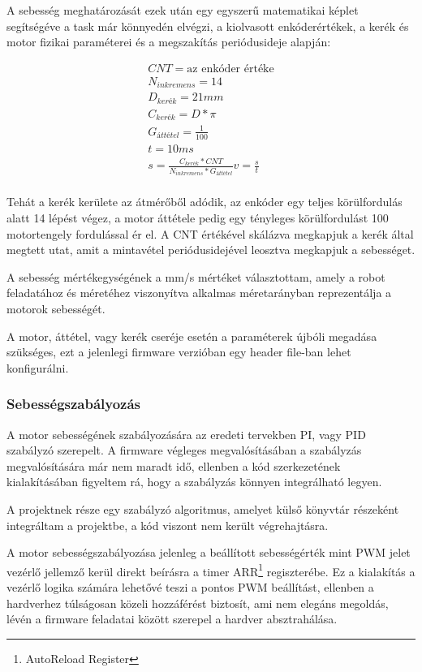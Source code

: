A sebesség meghatározását ezek után egy egyszerű matematikai képlet segítségéve a
task már könnyedén elvégzi, a kiolvasott enkóderértékek, a kerék és motor fizikai
paraméterei és a megszakítás periódusideje alapján:

\begin{eqnarray*}
CNT = \text{az enkóder értéke} \\
N_{inkremens} = 14 \\
D_{kerék} = 21 mm \\
C_{kerék} = D * \pi \\
G_{áttétel} = \frac{1}{100} \\
t = 10 ms \\
s = \frac{C_{kerék} * CNT}{N_{inkremens} * G_{áttétel}}
v = \frac{s}{t} \\
\end{eqnarray*}

Tehát a kerék kerülete az átmérőből adódik, az enkóder egy teljes körülfordulás
alatt 14 lépést végez, a motor áttétele pedig egy tényleges körülfordulást 100
motortengely fordulással ér el. A CNT értékével skálázva megkapjuk a kerék által
megtett utat, amit a mintavétel periódusidejével leosztva megkapjuk a
sebességet.

A sebesség mértékegységének a mm/s mértéket választottam, amely a robot
feladatához  és méretéhez viszonyítva alkalmas méretarányban reprezentálja a
motorok sebességét.

A motor, áttétel, vagy kerék cseréje esetén a paraméterek újbóli megadása
szükséges, ezt a jelenlegi firmware verzióban egy header file-ban lehet
konfigurálni. 

\subsubsection{Sebességszabályozás}

A motor sebességének szabályozására az eredeti tervekben PI, vagy PID szabályzó
szerepelt. A firmware végleges megvalósításában a szabályzás megvalósítására már
nem maradt idő, ellenben a kód szerkezetének kialakításában figyeltem rá, hogy a
szabályzás könnyen integrálható legyen.

A projektnek része egy szabályzó algoritmus, amelyet külső könyvtár
részeként integráltam a projektbe, a kód viszont nem került
végrehajtásra.


A motor sebességszabályozása jelenleg a beállított sebességérték mint PWM jelet
vezérlő jellemző kerül direkt beírásra a timer ARR\footnote{AutoReload Register}
regiszterébe. Ez a kialakítás a vezérlő logika számára lehetővé teszi a pontos
PWM beállítást, ellenben a hardverhez túlságosan közeli hozzáférést biztosít, ami
nem elegáns megoldás, lévén a firmware feladatai között szerepel a hardver
absztrahálása.

